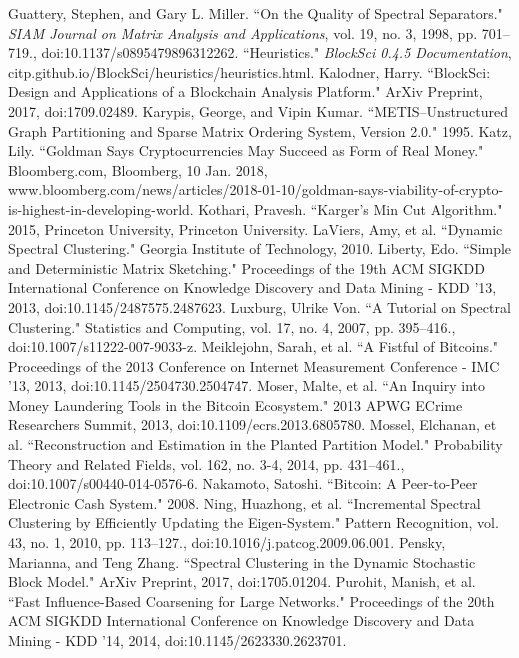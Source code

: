 \documentclass[journal]{IEEEtran}
\begin{document}
\begin{thebibliography}{1}
 Guattery, Stephen, and Gary L. Miller. ``On the Quality of Spectral Separators." \textit{SIAM Journal on Matrix Analysis and Applications}, vol. 19, no. 3, 1998, pp. 701–719., doi:10.1137/s0895479896312262. 
 ``Heuristics." \textit{BlockSci 0.4.5 Documentation}, citp.github.io/BlockSci/heuristics/heuristics.html. 
 Kalodner, Harry. ``BlockSci: Design and Applications of a Blockchain Analysis Platform." ArXiv Preprint, 2017, doi:1709.02489.
 Karypis, George, and Vipin Kumar. ``METIS--Unstructured Graph Partitioning and Sparse Matrix Ordering System, Version 2.0." 1995.
 Katz, Lily. ``Goldman Says Cryptocurrencies May Succeed as Form of Real Money." Bloomberg.com, Bloomberg, 10 Jan. 2018, www.bloomberg.com/news/articles/2018-01-10/goldman-says-viability-of-crypto-is-highest-in-developing-world.
 Kothari, Pravesh. ``Karger's Min Cut Algorithm." 2015, Princeton University, Princeton University.
 LaViers, Amy, et al. ``Dynamic Spectral Clustering." Georgia Institute of Technology, 2010.
 Liberty, Edo. ``Simple and Deterministic Matrix Sketching." Proceedings of the 19th ACM SIGKDD International Conference on Knowledge Discovery and Data Mining - KDD '13, 2013, doi:10.1145/2487575.2487623.
 Luxburg, Ulrike Von. ``A Tutorial on Spectral Clustering." Statistics and Computing, vol. 17, no. 4, 2007, pp. 395–416., doi:10.1007/s11222-007-9033-z.
 Meiklejohn, Sarah, et al. ``A Fistful of Bitcoins." Proceedings of the 2013 Conference on Internet Measurement Conference - IMC '13, 2013, doi:10.1145/2504730.2504747.
 Moser, Malte, et al. ``An Inquiry into Money Laundering Tools in the Bitcoin Ecosystem." 2013 APWG ECrime Researchers Summit, 2013, doi:10.1109/ecrs.2013.6805780.
 Mossel, Elchanan, et al. ``Reconstruction and Estimation in the Planted Partition Model." Probability Theory and Related Fields, vol. 162, no. 3-4, 2014, pp. 431–461., doi:10.1007/s00440-014-0576-6.
 Nakamoto, Satoshi. ``Bitcoin: A Peer-to-Peer Electronic Cash System." 2008.
 Ning, Huazhong, et al. ``Incremental Spectral Clustering by Efficiently Updating the Eigen-System." Pattern Recognition, vol. 43, no. 1, 2010, pp. 113–127., doi:10.1016/j.patcog.2009.06.001.
 Pensky, Marianna, and Teng Zhang. ``Spectral Clustering in the Dynamic Stochastic Block Model." ArXiv Preprint, 2017, doi:1705.01204.
 Purohit, Manish, et al. ``Fast Influence-Based Coarsening for Large Networks." Proceedings of the 20th ACM SIGKDD International Conference on Knowledge Discovery and Data Mining - KDD '14, 2014, doi:10.1145/2623330.2623701.

\end{thebibliography}
\end{document}
